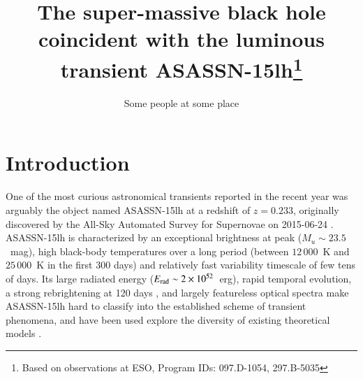 \documentclass[traditabstract]{aa}
\begin{document}
\title{The super-massive black hole coincident with the luminous transient ASASSN-15lh\thanks{Based on observations at ESO, Program IDs: 097.D-1054, 297.B-5035}}


\author{Some people at some place}


\abstract{}


\keywords{}
\maketitle

\section{Introduction}
\label{sec:Intro}

One of the most curious astronomical transients reported in the recent year was arguably the object named ASASSN-15lh at a redshift of $z=0.233$, originally discovered by the All-Sky Automated Survey for Supernovae \citep[ASAS-SN][]{2014ApJ...788...48S} on 2015-06-24 \citep{2015ATel.7642....1N}. ASASSN-15lh is characterized by an exceptional brightness at peak ($M_u\sim23.5$~mag), high black-body temperatures over a long period (between $12\,000$~K and $25\,000$~K in the first 300 days) and relatively fast variability timescale of few tens of days. Its large radiated energy ($E_{\rm rad}\sim2\times10^{52}$~erg), rapid temporal evolution, a strong rebrightening at 120 days \citep{2016ApJ...828....3B}, and largely featureless optical spectra \citep{2016Sci...351..257D, 2016NatAs...1E...2L} make ASASSN-15lh hard to classify into the established scheme of transient phenomena, and have been used explore the diversity of existing theoretical models \citep{2015MNRAS.454.3311M, 2016ApJ...817L...8B}.
\end{document}
